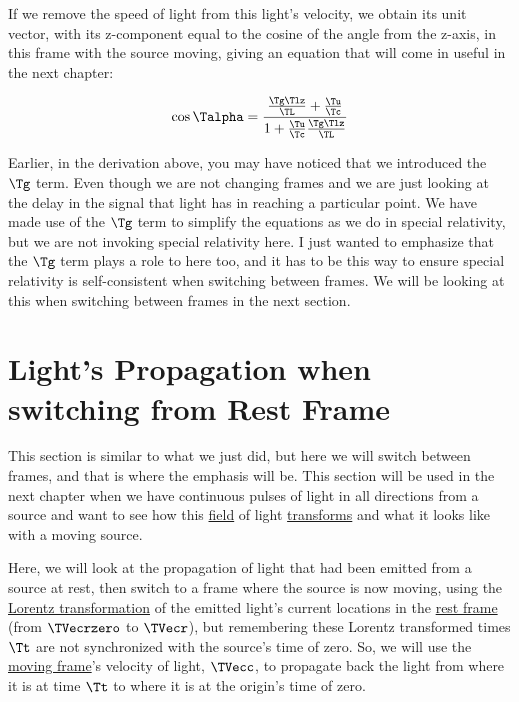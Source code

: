 If we remove the speed of light from this light's velocity, we obtain its unit vector, with its z-component equal to the cosine of the angle from the z-axis, in this frame with the source moving, giving an equation that will come in useful in the next chapter:

\begin{equation}
	\label{eq: cos alpha prime in terms of l}
	\cos{\Talpha } = \frac{\frac{\Tg  \Tlz  }{\TL } + \frac{\Tu }{\Tc } }{1 + \frac{\Tu }{\Tc } \frac{\Tg  \Tlz  }{\TL } }
\end{equation}

Earlier, in the derivation above, you may have noticed that we introduced the $\Tg $ term.
Even though we are not changing frames and we are just looking at the delay in the signal that light has in reaching a particular point.
We have made use of the $\Tg $ term to simplify the equations as we do in special relativity, but we are not invoking special relativity here.
I just wanted to emphasize that the $\Tg $ term plays a role to here too, and it has to be this way to ensure special relativity is self-consistent when switching between frames.
We will be looking at this when switching between frames in the next section.


\section{Light's Propagation when switching from Rest Frame}\label{subsect: Emitted Light When switching Frame}

This section is similar to what we just did, but here we will switch between frames, and that is where the emphasis will be.
This section will be used in the next chapter when we have continuous pulses of light in all directions from a source and want to see how this \hyperlink{def-field}{field} of light \hyperlink{def-transform}{transforms} and what it looks like with a moving source.

Here, we will look at the propagation of light that had been emitted from a source at rest, then switch to a frame where the source is now moving, using the \hyperlink{def-lorentz-transform}{Lorentz transformation} of the emitted light's current locations in the \hyperlink{def-proper-frame}{rest frame} (from $\TVecrzero $ to $\TVecr $), but remembering these Lorentz transformed times $\Tt $ are not synchronized with the source's time of zero.
So, we will use the \hyperlink{def-Moving-Frame}{moving frame}'s velocity of light, $\TVecc $, to propagate back the light from where it is at time $\Tt $ to where it is at the origin's time of zero.



